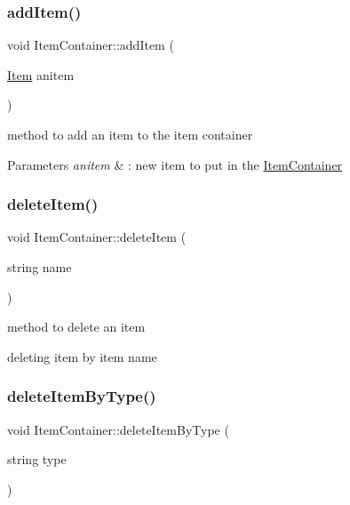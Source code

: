 \subsubsection{\texorpdfstring{add\+Item()}{addItem()}}
{\footnotesize\ttfamily void Item\+Container\+::add\+Item (\begin{DoxyParamCaption}\item[{\hyperlink{class_item}{Item}}]{anitem }\end{DoxyParamCaption})}

method to add an item to the item container 
\begin{DoxyParams}{Parameters}
{\em anitem} & \+: new item to put in the \hyperlink{class_item_container}{Item\+Container} \\
\hline
\end{DoxyParams}
\hypertarget{class_item_container_ac5d279c415c4ef60282c7b87a73a99b5}{}\label{class_item_container_ac5d279c415c4ef60282c7b87a73a99b5} 
\subsubsection{\texorpdfstring{delete\+Item()}{deleteItem()}}
{\footnotesize\ttfamily void Item\+Container\+::delete\+Item (\begin{DoxyParamCaption}\item[{string}]{name }\end{DoxyParamCaption})}



method to delete an item 

deleting item by item name \hypertarget{class_item_container_aeb9b5f9389de01eb93e44993251c2170}{}\label{class_item_container_aeb9b5f9389de01eb93e44993251c2170} 
\subsubsection{\texorpdfstring{delete\+Item\+By\+Type()}{deleteItemByType()}}
{\footnotesize\ttfamily void Item\+Container\+::delete\+Item\+By\+Type (\begin{DoxyParamCaption}\item[{string}]{type }\end{DoxyParamCaption})}



